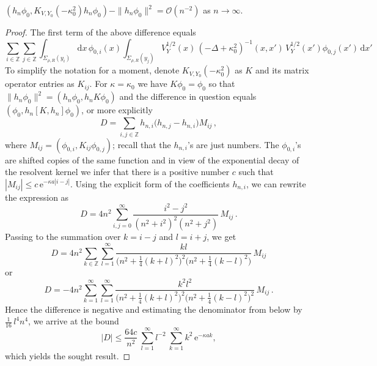 \documentclass[10pt,a4paper]{amsart}
\newcommand{\D}{\mathrm{d}}
\newcommand{\OO}{\mathcal{O}}
\newcommand{\Z}{\mathbb{Z}}
\newcommand{\e}{\mathrm{e}}
\begin{document}
\begin{lemma} \label{l:BSmollif}
$(h_n\phi_0, K_{V,Y_0}(-\kappa_0^2)h_n\phi_0) - \|h_n\phi_0\|^2=\OO(n^{-2})$ as $n\to\infty$.
\end{lemma}

\begin{proof}
The first term of the above difference equals
\begin{equation*}
\sum_{i\in\Z} \sum_{j\in\Z} \int_{\Sigma_{\rho,R}(y_i)} \! \D x\, \phi_{0,i}(x) \int_{\Sigma_{\rho,R}(y_j)} \! V_Y^{1/2}(x)\, (-\Delta+\kappa_0^2)^{-1}(x,x')\, V_Y^{1/2}(x') \phi_{0,j}(x')\,\D x'
\end{equation*}
To simplify the notation for a moment, denote $K_{V,Y_0}(-\kappa_0^2)$ as $K$ and its matrix operator entries as $K_{ij}$. For $\kappa=\kappa_0$ we have $K\phi_0=\phi_0$ so that $\|h_n\phi_0\|^2 = (h_n\phi_0, h_n K\phi_0)$ and the difference in question equals $(\phi_0,h_n[K,h_n]\phi_0)$, or more explicitly
\begin{equation*}
D = \sum_{i,j\in\Z} h_{n,i} \big(h_{n,j}-h_{n,i}\big) M_{ij}\,,
\end{equation*}
where $M_{ij}= (\phi_{0,i}, K_{ij}\phi_{0,j})$; recall that the $h_{n,i}$'s are just numbers. The $\phi_{0,i}$'s are shifted copies of the same function and in view of the exponential decay of the resolvent kernel we infer that there is a positive number $c$ such that $|M_{ij}|\le c\,\e^{-\kappa a|i-j|}$. Using the explicit form of the coefficients $h_{n,i}$, we can rewrite the expression as
\begin{equation*}
D = 4n^2 \sum_{i,j=0}^\infty \frac{i^2-j^2}{(n^2+i^2)^2(n^2+j^2)}\,M_{ij}\,.
\end{equation*}
Passing to the summation over $k=i-j$ and $l=i+j$, we get
 \begin{equation*}
D = 4n^2 \sum_{k\in\Z} \sum_{l=1}^\infty \frac{kl}{\big(n^2+\frac14(k+l)^2\big)^2 \big(n^2+\frac14(k-l)^2\big)}\,M_{ij}
\end{equation*}
or
\begin{equation*}
D = -4n^2 \sum_{k=1}^\infty \sum_{l=1}^\infty \frac{k^2l^2}{\big(n^2+\frac14(k+l)^2\big)^2 \big(n^2+\frac14(k-l)^2\big)^2}\,M_{ij}\,.
\end{equation*}
Hence the difference is negative and estimating the denominator from below by $\frac{1}{16}\,l^4n^4$, we arrive at the bound
\begin{equation*}
|D| \le \frac{64c}{n^2} \: \sum_{l=1}^\infty l^{-2} \: \sum_{k=1}^\infty k^2\,\e^{-\kappa ak},
\end{equation*}
which yields the sought result.
\end{proof}
\end{document}
